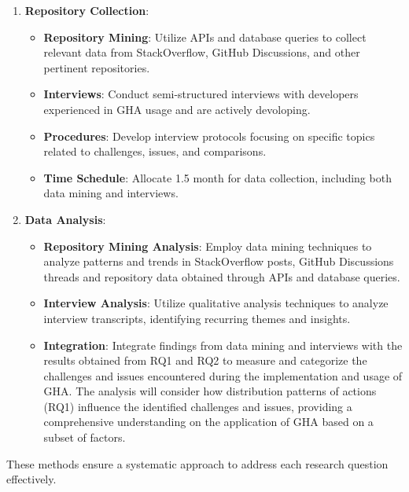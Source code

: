 \documentclass[conference]{IEEEtran}
\begin{document}
\begin{enumerate}
    \item \textbf{Repository Collection}:\\
    \begin{itemize}
        \item \textbf{Repository Mining}: Utilize APIs and database queries to collect relevant data from StackOverflow, GitHub Discussions, and other pertinent repositories.
        \item \textbf{Interviews}: Conduct semi-structured interviews with developers experienced in GHA usage and are actively devoloping.
        \item \textbf{Procedures}: Develop interview protocols focusing on specific topics related to challenges, issues, and comparisons.
        \item \textbf{Time Schedule}: Allocate 1.5 month for data collection, including both data mining and interviews.\\
    \end{itemize}
    
    \item \textbf{Data Analysis}:\\
    \begin{itemize}
        \item \textbf{Repository Mining Analysis}: Employ data mining techniques to analyze patterns and trends in StackOverflow posts, GitHub Discussions threads and repository data obtained through APIs and database queries.
        \item \textbf{Interview Analysis}: Utilize qualitative analysis techniques to analyze interview transcripts, identifying recurring themes and insights.
        \item \textbf{Integration}: Integrate findings from data mining and interviews with the results obtained from RQ1 and RQ2 to measure and categorize the challenges and issues encountered during the implementation and usage of GHA. The analysis will consider how distribution patterns of actions (RQ1) influence the identified challenges and issues, providing a comprehensive understanding on the application of GHA based on a subset of factors.\\
    \end{itemize}
\end{enumerate}

These methods ensure a systematic approach to address each research question effectively.\\
\end{document}
